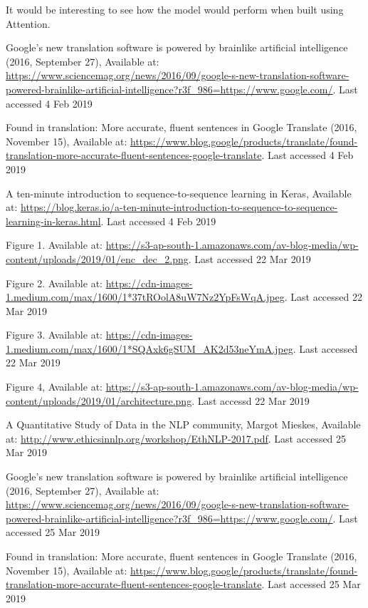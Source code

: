 \documentclass[runningheads]{llncs}
\begin{document}
	It would be interesting to see how the model would perform when built using Attention.
	
\begin{thebibliography}{8}
	
	
	Google’s new translation software is powered by brainlike artificial intelligence (2016, September 27), Available at:
	\url{https://www.sciencemag.org/news/2016/09/google-s-new-translation-software-powered-brainlike-artificial-intelligence?r3f\_986=https://www.google.com/}.  Last accessed 4 Feb 2019
	
	
	Found in translation: More accurate, fluent sentences in Google Translate (2016, November 15), Available at: \url{https://www.blog.google/products/translate/found-translation-more-accurate-fluent-sentences-google-translate}.  Last accessed 4 Feb 2019

	A ten-minute introduction to sequence-to-sequence learning in Keras, Available at: \url{https://blog.keras.io/a-ten-minute-introduction-to-sequence-to-sequence-learning-in-keras.html}.  Last accessed 4 Feb 2019
	
	Figure 1. Available at: \url{https://s3-ap-south-1.amazonaws.com/av-blog-media/wp-content/uploads/2019/01/enc_dec_2.png}.  Last accessed 22 Mar 2019
	
	Figure 2. Available at: \url{https://cdn-images-1.medium.com/max/1600/1*37tROolA8uW7Nz2YpFsWqA.jpeg}.  Last accessed 22 Mar 2019

	Figure 3. Available at: \url{https://cdn-images-1.medium.com/max/1600/1*SQAxk6gSUM_AK2d53neYmA.jpeg}. Last accessed 22 Mar 2019

	Figure 4, Available at: \url{https://s3-ap-south-1.amazonaws.com/av-blog-media/wp-content/uploads/2019/01/architecture.png}. Last accessd 22 Mar 2019
	
	A Quantitative Study of Data in the NLP community, Margot Mieskes, Available at: \url{http://www.ethicsinnlp.org/workshop/EthNLP-2017.pdf}.  Last accessed 25 Mar 2019

	Google’s new translation software is powered by brainlike artificial intelligence (2016, September 27), Available at: \url{https://www.sciencemag.org/news/2016/09/google-s-new-translation-software-powered-brainlike-artificial-intelligence?r3f\_986=https://www.google.com/}.  Last accessed 25 Mar 2019

	Found in translation: More accurate, fluent sentences in Google Translate (2016, November 15), Available at: \url{https://www.blog.google/products/translate/found-translation-more-accurate-fluent-sentences-google-translate}.  Last accessed 25 Mar 2019


\end{thebibliography}
\end{document}
